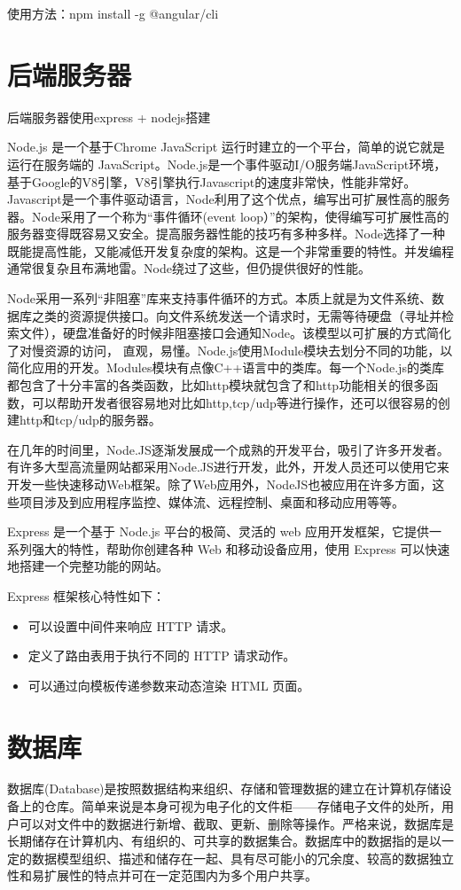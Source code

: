 使用方法：npm install -g @angular/cli

\section{后端服务器}
\label{sec:server}
后端服务器使用express + nodejs搭建

Node.js\cite{Nodejs} 是一个基于Chrome JavaScript 运行时建立的一个平台，简单的说它就是运行在服务端的 JavaScript。Node.js是一个事件驱动I/O服务端JavaScript环境，基于Google的V8引擎，V8引擎执行Javascript的速度非常快，性能非常好。Javascript是一个事件驱动语言，Node利用了这个优点，编写出可扩展性高的服务器。Node采用了一个称为“事件循环(event loop）”的架构，使得编写可扩展性高的服务器变得既容易又安全。提高服务器性能的技巧有多种多样。Node选择了一种既能提高性能，又能减低开发复杂度的架构。这是一个非常重要的特性。并发编程通常很复杂且布满地雷。Node绕过了这些，但仍提供很好的性能。

Node采用一系列“非阻塞”库来支持事件循环的方式。本质上就是为文件系统、数据库之类的资源提供接口。向文件系统发送一个请求时，无需等待硬盘（寻址并检索文件），硬盘准备好的时候非阻塞接口会通知Node。该模型以可扩展的方式简化了对慢资源的访问， 直观，易懂。Node.js使用Module模块去划分不同的功能，以简化应用的开发。Modules模块有点像C++语言中的类库。每一个Node.js的类库都包含了十分丰富的各类函数，比如http模块就包含了和http功能相关的很多函数，可以帮助开发者很容易地对比如http,tcp/udp等进行操作，还可以很容易的创建http和tcp/udp的服务器。

在几年的时间里，Node.JS逐渐发展成一个成熟的开发平台，吸引了许多开发者。有许多大型高流量网站都采用Node.JS进行开发，此外，开发人员还可以使用它来开发一些快速移动Web框架。除了Web应用外，NodeJS也被应用在许多方面，这些项目涉及到应用程序监控、媒体流、远程控制、桌面和移动应用等等。

Express 是一个基于 Node.js 平台的极简、灵活的 web 应用开发框架，它提供一系列强大的特性，帮助你创建各种 Web 和移动设备应用，使用 Express 可以快速地搭建一个完整功能的网站。

Express 框架核心特性如下：
\begin{itemize}
	\item 可以设置中间件来响应 HTTP 请求。
	\item 定义了路由表用于执行不同的 HTTP 请求动作。
	\item 可以通过向模板传递参数来动态渲染 HTML 页面。
\end{itemize}

\section{数据库}
\label{sec:database}
数据库(Database)是按照数据结构来组织、存储和管理数据的建立在计算机存储设备上的仓库\cite{XU}。简单来说是本身可视为电子化的文件柜——存储电子文件的处所，用户可以对文件中的数据进行新增、截取、更新、删除等操作。严格来说，数据库是长期储存在计算机内、有组织的、可共享的数据集合。数据库中的数据指的是以一定的数据模型组织、描述和储存在一起、具有尽可能小的冗余度、较高的数据独立性和易扩展性的特点并可在一定范围内为多个用户共享\cite{wdb}。

